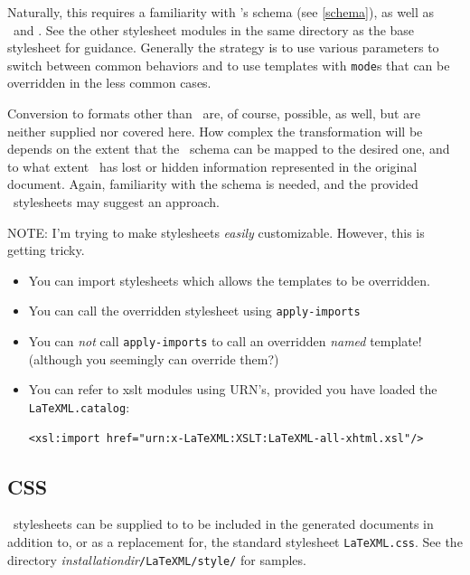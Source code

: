 \documentclass{book}
\begin{document}
Naturally, this requires a familiarity with \LaTeXML's schema (see \ref{schema}),
as well as \XSLT\ and \XHTML.  See the other stylesheet modules in the same directory
as the base stylesheet for guidance.
Generally the strategy is to use various parameters to switch
between common behaviors and to use templates with \texttt{mode}s
that can be overridden in the less common cases.

Conversion to formats other than \XHTML\ are, of course, possible, as well,
but are neither supplied nor covered here.
How complex the transformation will be depends on the extent
that the \LaTeXML\ schema can be mapped to the desired one,
and to what extent \LaTeXML\ has lost or hidden information
represented in the original document.  Again, familiarity with the schema is needed,
and the provided \XHTML\ stylesheets may suggest an approach.

NOTE: I'm trying to make stylesheets \emph{easily} customizable.
However, this is getting tricky.
\begin{itemize}
\item You can import stylesheets which allows the templates to be overridden.
\item You can call the overridden stylesheet using \texttt{apply-imports}
\item You can \emph{not} call \texttt{apply-imports} to call an overridden
\emph{named} template! (although you seemingly can override them?)
\item You can refer to xslt modules using URN's, provided you have loaded
the \texttt{LaTeXML.catalog}:
{\small
\begin{lstlisting}[style=xml]
<xsl:import href="urn:x-LaTeXML:XSLT:LaTeXML-all-xhtml.xsl"/>
\end{lstlisting}
}
\end{itemize}

\subsection{CSS}\label{customization.latexmlpost.css}
\CSS\ stylesheets can be supplied to  to
be included in the generated documents in addition to, or as a
replacement for, the standard stylesheet \texttt{LaTeXML.css}.
See the directory
\textit{installationdir}\texttt{/LaTeXML/style/}
for samples.
\end{document}
